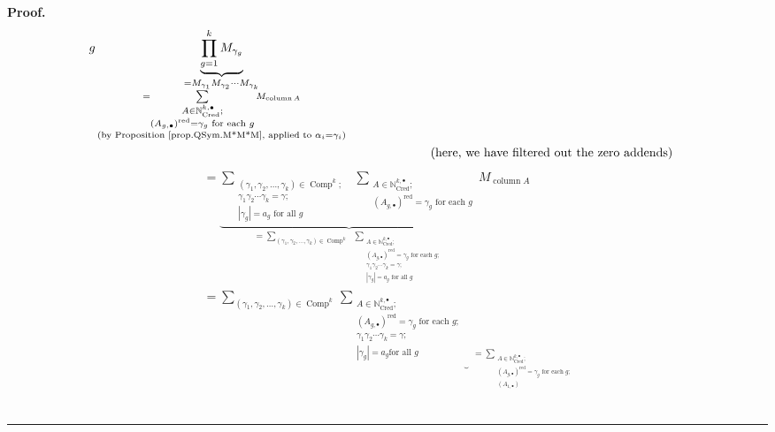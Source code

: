 \documentclass[numbers=enddot,12pt,final,onecolumn,notitlepage,abstracton]{scrartcl}%
\theoremstyle{definition}
\newenvironment{proof}[1][Proof]{\noindent\textbf{#1.} }{\ \rule{0.5em}{0.5em}}
\let\sumnonlimits\sum
\let\prodnonlimits\prod
\renewcommand{\sum}{\sumnonlimits\limits}
\renewcommand{\prod}{\prodnonlimits\limits}
\begin{document}
\begin{proof}
\begin{align*}
{{g}}\underbrace{\prod_{g=1}^{k}M_{\gamma_{g}}}_{\substack{=M_{\gamma_{1}%
}M_{\gamma_{2}}\cdots M_{\gamma_{k}}\\=\sum_{\substack{A\in\mathbb{N}%
_{\operatorname*{Cred}}^{k,\bullet};\\\left(  A_{g,\bullet}\right)
^{\operatorname*{red}}=\gamma_{g}\text{ for each }g}}M_{\operatorname*{column}%
A}\\\text{(by Proposition \ref{prop.QSym.M*M*M}, applied to }\alpha_{i}%
=\gamma_{i}\text{)}}}\\
&  \ \ \ \ \ \ \ \ \ \ \ \ \ \ \ \ \ \ \ \ \left(  \text{here, we have
filtered out the zero addends}\right)
\end{align*}%
\begin{align}
&  =\underbrace{\sum_{\substack{\left(  \gamma_{1},\gamma_{2},\ldots
,\gamma_{k}\right)  \in\operatorname*{Comp}\nolimits^{k};\\\gamma_{1}%
\gamma_{2}\cdots\gamma_{k}=\gamma;\\\left\vert \gamma_{g}\right\vert
=a_{g}\text{ for all }g}}\ \ \sum_{\substack{A\in\mathbb{N}%
_{\operatorname*{Cred}}^{k,\bullet};\\\left(  A_{g,\bullet}\right)
^{\operatorname*{red}}=\gamma_{g}\text{ for each }g}}}_{=\sum_{\left(
\gamma_{1},\gamma_{2},\ldots,\gamma_{k}\right)  \in\operatorname*{Comp}%
\nolimits^{k}}\ \ \sum_{\substack{A\in\mathbb{N}_{\operatorname*{Cred}%
}^{k,\bullet};\\\left(  A_{g,\bullet}\right)  ^{\operatorname*{red}}%
=\gamma_{g}\text{ for each }g;\\\gamma_{1}\gamma_{2}\cdots\gamma_{k}%
=\gamma;\\\left\vert \gamma_{g}\right\vert =a_{g}\text{ for all }g}%
}}M_{\operatorname*{column}A}\nonumber\\
&  =\sum_{\left(  \gamma_{1},\gamma_{2},\ldots,\gamma_{k}\right)
\in\operatorname*{Comp}\nolimits^{k}}\underbrace{\sum_{\substack{A\in
\mathbb{N}_{\operatorname*{Cred}}^{k,\bullet};\\\left(  A_{g,\bullet}\right)
^{\operatorname*{red}}=\gamma_{g}\text{ for each }g;\\\gamma_{1}\gamma
_{2}\cdots\gamma_{k}=\gamma;\\\left\vert \gamma_{g}\right\vert =a_{g}\text{
for all }g}}}_{\substack{=\sum_{\substack{A\in\mathbb{N}_{\operatorname*{Cred}%
}^{k,\bullet};\\\left(  A_{g,\bullet}\right)  ^{\operatorname*{red}}%
=\gamma_{g}\text{ for each }g;\\\left(  A_{1,\bullet}\right)
}}}}
\end{align}
\end{proof}
\end{document}
